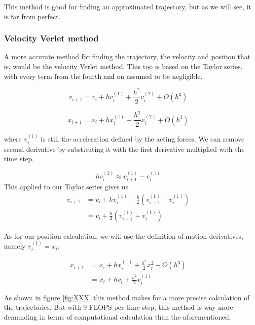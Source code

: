 \documentclass[10pt]{article}
\begin{document}
\begin{multicols}{2}
This method is good for finding an approximated trajectory, but as we will
see, it is far from perfect.


\subsubsection{Velocity Verlet method}
A more accurate method for finding the trajectory, the velocity and
position that is, would be the velocity Verlet method. This too is based on
the Taylor series, with every term from the fourth and on assumed to be
negligible.

\begin{equation}
    v_{i+1} = v_i +hv_i^{(1)}+\frac{h^2}{2}v_i^{(2)}+O(h^3)
\end{equation}

\begin{equation}
    x_{i+1} = x_i +hx_i^{(1)}+\frac{h^2}{2}x_i^{(2)}+O(h^3)
\end{equation}

where $v_i^{(1)}$ is still the acceleration defined by the acting forces.
We can remove second derivative by substituting it with the first
derivative multiplied with the time step. 

\begin{equation}
    hv_i^{(2)} \approx v_{i+1}^{(1)}-v_i^{(1)}\nonumber
\end{equation}
This applied to our Taylor series gives us
\begin{align}
    v_{i+1} &= v_i + hv_i^{(1)}+\frac{h}{2}\left(v_{i+1}^{(1)}-v_i^{(1)}\right)\nonumber\\
    &= v_i+\frac{h}{2}\left(v_{i+1}^{(1)}+v_i^{(1)}\right)
\end{align}

As for our position calculation, we will use the definition of motion
derivatives, namely $v_i^{(1)}=x_i$.

\begin{align}
    x_{i+1} &= x_i +hx_i^{(1)}+\frac{h^2}{2}x_i^{2}+O(h^3)\nonumber\\
    &= x_i + hv_i + \frac{h^2}{2}v_i^{(1)}
\end{align}

As shown in figure \cref{fig:XXX} this method makes for a more precise
calculation of the trajectories. But with 9 FLOPS per time step, this
method is way more demanding in terms of computational calculation than the
aforementioned.



\end{multicols}
\end{document}
